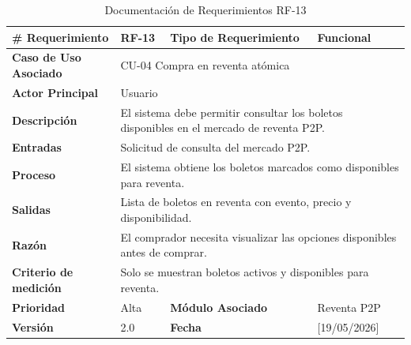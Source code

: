 \documentclass[12pt,letterpaper]{article}
\begin{document}
\begin{table}[H]
\centering
\scriptsize
\renewcommand{\arraystretch}{1.05}
\setlength{\tabcolsep}{3pt}

\newlength{\anchoceldaRFtrece}
\setlength{\anchoceldaRFtrece}{\dimexpr\textwidth-2.7cm-8\tabcolsep-5\arrayrulewidth\relax}

\begin{tabularx}{\textwidth}{|p{2.7cm}|X|p{2.8cm}|X|}
\hline
\textbf{\# Requerimiento} & RF-13 & \textbf{Tipo de Requerimiento} & Funcional \\ \hline

\textbf{Caso de Uso Asociado} & 
\multicolumn{3}{p{\anchoceldaRFtrece}|}{CU-04 Compra en reventa atómica} \\ \hline

\textbf{Actor Principal} & 
\multicolumn{3}{p{\anchoceldaRFtrece}|}{Usuario} \\ \hline

\textbf{Descripción} & 
\multicolumn{3}{p{\anchoceldaRFtrece}|}{El sistema debe permitir consultar los boletos disponibles en el mercado de reventa P2P.} \\ \hline

\textbf{Entradas} & 
\multicolumn{3}{p{\anchoceldaRFtrece}|}{Solicitud de consulta del mercado P2P.} \\ \hline

\textbf{Proceso} & 
\multicolumn{3}{p{\anchoceldaRFtrece}|}{El sistema obtiene los boletos marcados como disponibles para reventa.} \\ \hline

\textbf{Salidas} & 
\multicolumn{3}{p{\anchoceldaRFtrece}|}{Lista de boletos en reventa con evento, precio y disponibilidad.} \\ \hline

\textbf{Razón} & 
\multicolumn{3}{p{\anchoceldaRFtrece}|}{El comprador necesita visualizar las opciones disponibles antes de comprar.} \\ \hline

\textbf{Criterio de medición} & 
\multicolumn{3}{p{\anchoceldaRFtrece}|}{Solo se muestran boletos activos y disponibles para reventa.} \\ \hline

\textbf{Prioridad} & Alta & \textbf{Módulo Asociado} & Reventa P2P \\ \hline

\textbf{Versión} & 2.0 & \textbf{Fecha} & [19/05/2026] \\ \hline

\end{tabularx}

\caption{Documentación de Requerimientos RF-13}
\label{tab:documentacion_requerimientos_rf13}
\normalsize
\end{table}
\end{document}
